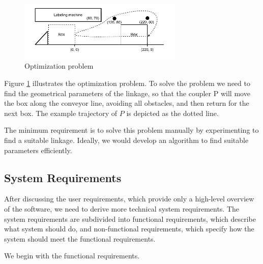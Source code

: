 \documentclass{article}
\begin{document}
\begin{itemize}
	\begin{figure}[h]
		\centering
		\includegraphics[width=0.7\textwidth]{./figures/optimization_problem_task.pdf}
		\caption{Optimization problem}
		\label{fig:optimization_problem}
	\end{figure}
	
	Figure \ref{fig:optimization_problem} illustrates the optimization problem. To solve the problem we need to find the geometrical parameters of the linkage, so that the coupler P will move the box along the conveyor line, avoiding all obstacles, and then return for the next box. The example trajectory of $P$ is depicted as the dotted line.
	
	The minimum requirement is to solve this problem manually by experimenting to find a suitable linkage. Ideally, we would develop an algorithm to find suitable parameters efficiently.
\end{itemize}

\subsection{System Requirements}

After discussing the user requirements, which provide only a high-level overview of the software, we need to derive more technical system requirements. The system requirements are subdivided into functional requirements, which describe what system should do, and non-functional requirements, which specify how the system should meet the functional requirements.

We begin with the functional requirements.
\end{document}
